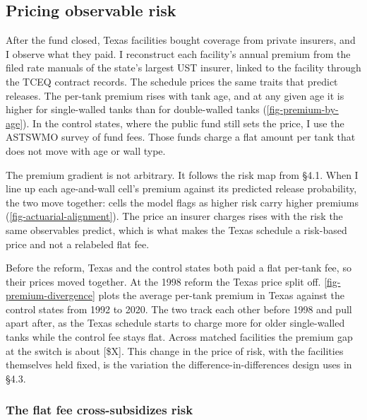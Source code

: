 \documentclass[
  12pt,
]{article}
\begin{document}
\subsection{Pricing observable risk}\label{pricing-observable-risk}

After the fund closed, Texas facilities bought coverage from private
insurers, and I observe what they paid. I reconstruct each facility's
annual premium from the filed rate manuals of the state's largest UST
insurer, linked to the facility through the TCEQ contract records. The
schedule prices the same traits that predict releases. The per-tank
premium rises with tank age, and at any given age it is higher for
single-walled tanks than for double-walled tanks
(\autoref{fig-premium-by-age}). In the control states, where the public
fund still sets the price, I use the ASTSWMO survey of fund fees. Those
funds charge a flat amount per tank that does not move with age or wall
type.

The premium gradient is not arbitrary. It follows the risk map from
§4.1. When I line up each age-and-wall cell's premium against its
predicted release probability, the two move together: cells the model
flags as higher risk carry higher premiums
(\autoref{fig-actuarial-alignment}). The price an insurer charges rises
with the risk the same observables predict, which is what makes the
Texas schedule a risk-based price and not a relabeled flat fee.

Before the reform, Texas and the control states both paid a flat
per-tank fee, so their prices moved together. At the 1998 reform the
Texas price split off. \autoref{fig-premium-divergence} plots the
average per-tank premium in Texas against the control states from 1992
to 2020. The two track each other before 1998 and pull apart after, as
the Texas schedule starts to charge more for older single-walled tanks
while the control fee stays flat. Across matched facilities the premium
gap at the switch is about {[}\$X{]}. This change in the price of risk,
with the facilities themselves held fixed, is the variation the
difference-in-differences design uses in §4.3.

\subsubsection{The flat fee cross-subsidizes
risk}\label{the-flat-fee-cross-subsidizes-risk}
\end{document}
